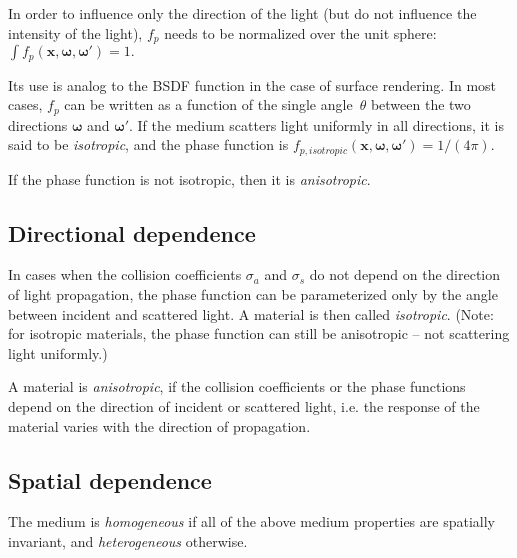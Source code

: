 In order to influence only the direction of the light (but do not influence the intensity of the light), $f_p$ needs to be normalized over the unit sphere:
$
    \int f_p(\textbf{x}, \boldsymbol{\omega},\boldsymbol{\omega}') = 1.
$

Its use is analog to the BSDF function in the case of surface rendering. In most cases, $f_p$ can be written as a function of the single angle~$\theta$ between the two directions $\boldsymbol{\omega}$ and $\boldsymbol{\omega}'$. If the medium scatters light uniformly in all directions, it is said to be \textit{isotropic}, and the phase function is
$
    f_{p, isotropic}(\textbf{x}, \boldsymbol{\omega},\boldsymbol{\omega}') = 
    1/(4\pi).
$

\noindent If the phase function is not isotropic, then it is \textit{anisotropic}.


\subsection{Directional dependence}
In cases when the collision coefficients $\sigma_a$ and $\sigma_s$ do not depend on the direction of light propagation, the phase function can be parameterized only by the angle between incident and scattered light. A material is then called \textit{isotropic}. (Note: for isotropic materials, the phase function can still be anisotropic -- not scattering light uniformly.)

A material is \textit{anisotropic}, if the collision coefficients or the phase functions depend on the direction of incident or scattered light, i.e. the response of the material varies with the direction of propagation.

\subsection{Spatial dependence}
The medium is \textit{homogeneous} if all of the above medium properties are spatially invariant, and \textit{heterogeneous} otherwise.